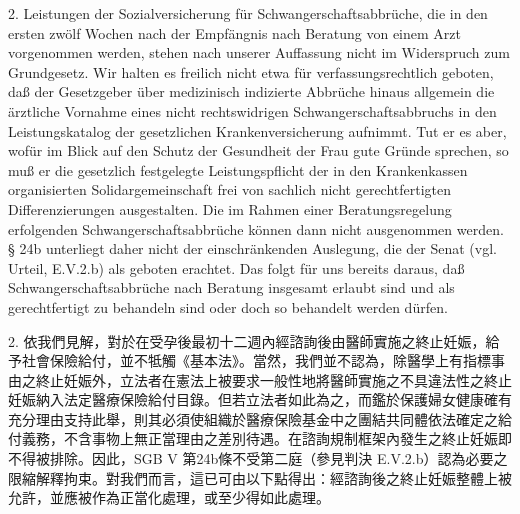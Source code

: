 \documentclass[12pt]{article}
\begin{document}
\begin{sourcepara}[title={原文SondervotumMS.308}]
2. Leistungen der Sozialversicherung für Schwangerschaftsabbrüche, die in den ersten zwölf Wochen nach der Empfängnis nach Beratung von einem Arzt vorgenommen werden, stehen nach unserer Auffassung nicht im Widerspruch zum Grundgesetz. Wir halten es freilich nicht etwa für verfassungsrechtlich geboten, daß der Gesetzgeber über medizinisch indizierte Abbrüche hinaus allgemein die ärztliche Vornahme eines nicht rechtswidrigen Schwangerschaftsabbruchs in den Leistungskatalog der gesetzlichen Krankenversicherung aufnimmt. Tut er es aber, wofür im Blick auf den Schutz der Gesundheit der Frau gute Gründe sprechen, so muß er die gesetzlich festgelegte Leistungspflicht der in den Krankenkassen organisierten Solidargemeinschaft frei von sachlich nicht gerechtfertigten Differenzierungen ausgestalten. Die im Rahmen einer Beratungsregelung erfolgenden Schwangerschaftsabbrüche können dann nicht ausgenommen werden. § 24b \abbrSGBV{} unterliegt daher nicht der einschränkenden Auslegung, die der Senat (vgl. Urteil, E.V.2.b) als geboten erachtet. Das folgt für uns bereits daraus, daß Schwangerschaftsabbrüche nach Beratung insgesamt erlaubt sind und als gerechtfertigt zu behandeln sind oder doch so behandelt werden dürfen.
\end{sourcepara}
\begin{transpara}
2. 依我們見解，對於在受孕後最初十二週內經諮詢後由醫師實施之終止妊娠，給予社會保險給付，並不牴觸《基本法》。當然，我們並不認為，除醫學上有指標事由之終止妊娠外，立法者在憲法上被要求一般性地將醫師實施之不具違法性之終止妊娠納入法定醫療保險給付目錄。但若立法者如此為之，而鑑於保護婦女健康確有充分理由支持此舉，則其必須使組織於醫療保險基金中之團結共同體依法確定之給付義務，不含事物上無正當理由之差別待遇。在諮詢規制框架內發生之終止妊娠即不得被排除。因此，SGB V 第24b條不受第二庭（參見判決 E.V.2.b）認為必要之限縮解釋拘束。對我們而言，這已可由以下點得出：經諮詢後之終止妊娠整體上被允許，並應被作為正當化處理，或至少得如此處理。
\end{transpara}
\end{document}
